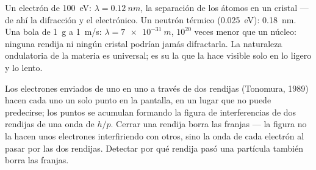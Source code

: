 \begin{example}\label{ex:b1:quantum-introduction:wavelengths}
Un electrón de \qty{100}{eV}: $\lambda = \qty{0.12}{nm}$, la separación de
los átomos en un cristal --- de ahí la difracción y el 
electrónico. Un neutrón térmico (\qty{0.025}{eV}): \qty{0.18}{nm}. Una
bola de \qty{1}{g} a \qty{1}{m/s}: $\lambda = \qty{7e-31}{m}$, $10^{20}$ veces
menor que un núcleo: ninguna rendija ni ningún cristal podrían jamás
difractarla. La naturaleza ondulatoria de la materia es universal; es su
 la que la hace visible solo en lo ligero y lo lento.
\end{example}

\begin{proposition}\label{prop:b1:quantum-introduction:buildup}
Los electrones enviados de uno en uno a través de dos rendijas
(Tonomura, 1989) hacen cada uno un solo punto en la pantalla, en un
lugar que no puede predecirse; los puntos se acumulan formando la figura
de interferencias de dos rendijas de una onda de  $h/p$.
Cerrar una rendija borra las franjas --- la figura no la hacen unos
electrones interfiriendo con otros, sino la onda de cada electrón al
pasar por las dos rendijas. Detectar por qué rendija pasó una partícula
también borra las franjas.
\end{proposition}
\admitted

